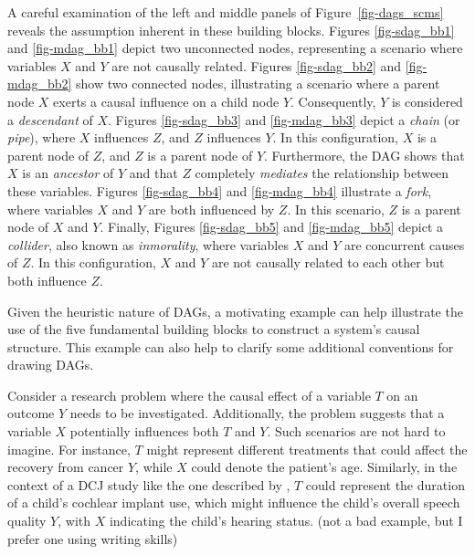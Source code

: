\documentclass[
  authoryear,
  preprint,
  1p]{elsarticle}
\begin{document}
A careful examination of the left and middle panels of
Figure~\ref{fig-dags_scms} reveals the assumption inherent in these
building blocks. Figures \ref{fig-sdag_bb1} and \ref{fig-mdag_bb1}
depict two unconnected nodes, representing a scenario where variables
\(X\) and \(Y\) are not causally related. Figures \ref{fig-sdag_bb2} and
\ref{fig-mdag_bb2} show two connected nodes, illustrating a scenario
where a parent node \(X\) exerts a causal influence on a child node
\(Y\). Consequently, \(Y\) is considered a \emph{descendant} of \(X\).
Figures \ref{fig-sdag_bb3} and \ref{fig-mdag_bb3} depict a \emph{chain}
(or \emph{pipe}), where \(X\) influences \(Z\), and \(Z\) influences
\(Y\). In this configuration, \(X\) is a parent node of \(Z\), and \(Z\)
is a parent node of \(Y\). Furthermore, the DAG shows that \(X\) is an
\emph{ancestor} of \(Y\) and that \(Z\) completely \emph{mediates} the
relationship between these variables. Figures \ref{fig-sdag_bb4} and
\ref{fig-mdag_bb4} illustrate a \emph{fork}, where variables \(X\) and
\(Y\) are both influenced by \(Z\). In this scenario, \(Z\) is a parent
node of \(X\) and \(Y\). Finally, Figures \ref{fig-sdag_bb5} and
\ref{fig-mdag_bb5} depict a \emph{collider}, also known as
\emph{inmorality}, where variables \(X\) and \(Y\) are concurrent causes
of \(Z\). In this configuration, \(X\) and \(Y\) are not causally
related to each other but both influence \(Z\).

Given the heuristic nature of DAGs, a motivating example can help
illustrate the use of the five fundamental building blocks to construct
a system's causal structure. This example can also help to clarify some
additional conventions for drawing DAGs.

Consider a research problem where the causal effect of a variable \(T\)
on an outcome \(Y\) needs to be investigated. Additionally, the problem
suggests that a variable \(X\) potentially influences both \(T\) and
\(Y\). Such scenarios are not hard to imagine. For instance, \(T\) might
represent different treatments that could affect the recovery from
cancer \(Y\), while \(X\) could denote the patient's age. Similarly, in
the context of a DCJ study like the one described by
\citet{Boonen_et_al_2020}, \(T\) could represent the duration of a
child's cochlear implant use, which might influence the child's overall
speech quality \(Y\), with \(X\) indicating the child's hearing status.
{(not a bad example, but I prefer one using writing skills)}
\end{document}
